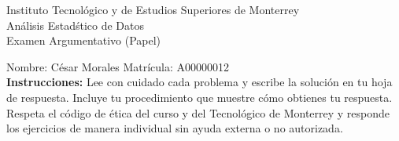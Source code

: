\documentclass[10pt]{report}
\begin{document}
\newpage



\begin{center}
{\large Instituto Tecnol\'{o}gico y de Estudios Superiores de Monterrey \\
An\'alisis Estad\'stico de Datos } \\
Examen Argumentativo (Papel)
\end{center}

Nombre: \underline{\hspace*{.2in}}
César Morales
\underline{\hspace*{.2in}} \quad Matr\'icula:\underline{\hspace*{.2in}}
A00000012
\underline{\hspace*{.2in}} \\

{\bf Instrucciones:} Lee con cuidado cada problema y escribe la soluci\'on
en tu hoja de respuesta. Incluye tu procedimiento que muestre c\'omo obtienes tu respuesta.  Respeta el c\'odigo de \'etica del curso y del Tecnol\'ogico de Monterrey y responde los ejercicios de manera individual sin ayuda externa o no autorizada.
\end{document}
